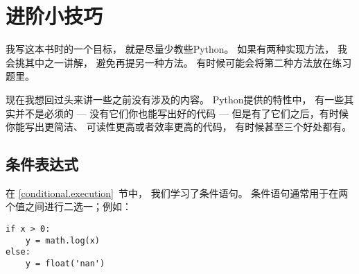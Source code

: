 

\chapter{进阶小技巧}


我写这本书时的一个目标， 就是尽量少教些Python。  如果有两种实现方法， 我会挑其中之一讲解， 避免再提另一种方法。  有时候可能会将第二种方法放在练习题里。


现在我想回过头来讲一些之前没有涉及的内容。  Python提供的特性中， 有一些其实并不是必须的 --- 没有它们你也能写出好的代码 --- 但是有了它们之后，有时候你能写出更简洁、 可读性更高或者效率更高的代码， 有时候甚至三个好处都有。


\section{条件表达式}


在 \ref{conditional.execution}~节中， 我们学习了条件语句。
条件语句通常用于在两个值之间进行二选一；例如：


\begin{lstlisting}
if x > 0:
    y = math.log(x)
else:
    y = float('nan')
\end{lstlisting}

